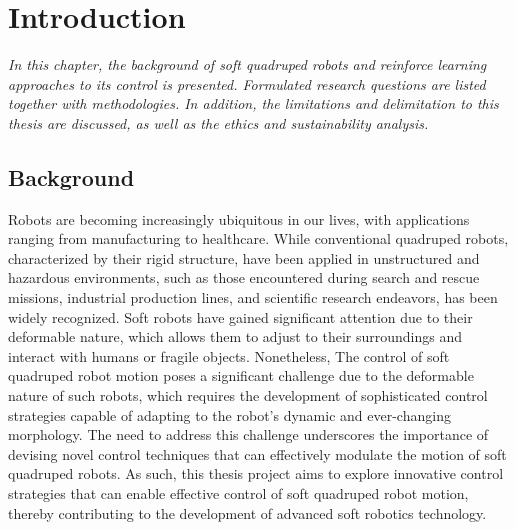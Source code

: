 \chapter{Introduction}
\label{chap1}
\textit{In this chapter, the background of soft quadruped robots and reinforce learning approaches to its control is presented. Formulated research questions are listed together with methodologies. In addition, the limitations and delimitation to this thesis are discussed, as well as the ethics and sustainability analysis.}

\section{Background}
Robots are becoming increasingly ubiquitous in our lives, with applications ranging from manufacturing to healthcare\cite{wangCurrentResearchesFuture2018}. While conventional quadruped robots, characterized by their rigid structure, have been applied in unstructured and hazardous environments, such as those encountered during search and rescue missions\cite{hawkesSoftRobotThat2017}, industrial production lines\cite{huDesignQuadrupedInspection2021}, and scientific research endeavors\cite{hewingLearningbasedModelPredictive2020}, has been widely recognized\cite{mengReviewQuadrupedRobots2016}. Soft robots have gained significant attention due to their deformable nature, which allows them to adjust to their surroundings and interact with humans or fragile objects\cite{muralidharanSoftQuadrupedRobot2021}. Nonetheless, The control of soft quadruped robot motion poses a significant challenge due to the deformable nature of such robots\cite{wangControlStrategiesSoft2022}, which requires the development of sophisticated control strategies capable of adapting to the robot's dynamic and ever-changing morphology\cite{wangControlStrategiesSoft2022}. The need to address this challenge underscores the importance of devising novel control techniques that can effectively modulate the motion of soft quadruped robots. As such, this thesis project aims to explore innovative control strategies that can enable effective control of soft quadruped robot motion, thereby contributing to the development of advanced soft robotics technology.

